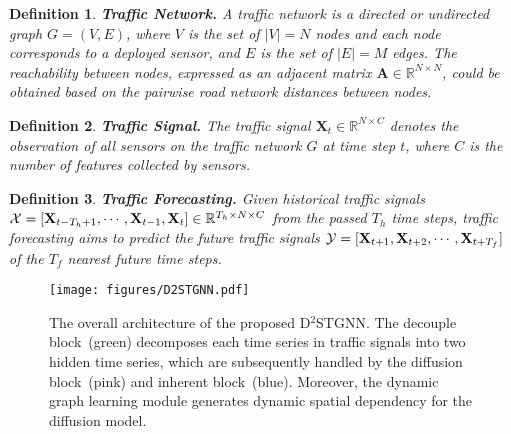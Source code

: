\documentclass[sigconf, nonacm]{acmart}
\def\bb#1{\mathbb{#1}}
\def\b#1{\mathbf{#1}}
\def\cal#1{\mathcal{#1}}
\newtheorem{definition}{Definition}
\begin{document}
\begin{definition}
\textbf{Traffic Network.} 
A traffic network is a directed or undirected graph $G=(V, E)$, where $V$ is the set of $|V|=N$ nodes and each node corresponds to a deployed sensor, {\color{black}and} $E$ is the set of $|E|=M$ edges. 
The reachability between nodes, expressed as an adjacent matrix $\b{A}\in\bb{R}^{N\times N}$, could be obtained based on the pairwise road network distances between nodes.
\end{definition}
\begin{definition}
\textbf{Traffic Signal.} 
The traffic signal $\b{X}_t\in\bb{R}^{N\times C}$ denotes the observation of all sensors on the traffic network $G$ at time step $t$, where {\color{black}$C$ is the number of features collected by sensors}.
\end{definition}
\begin{definition}
\textbf{Traffic Forecasting.}
Given historical traffic signals ${\color{black} \cal{X}}={\color{black}[}\mathbf{X}_{t-T_h+1},\cdots, \mathbf{X}_{t-1},\mathbf{X}_{t}{\color{black}]}\in\bb{R}^{T_h\times N\times C}$ from the passed $T_h$ time steps, traffic forecasting aims to predict the future traffic signals ${\color{black} \cal{Y}}={\color{black}[}\mathbf{X}_{t+1},\mathbf{X}_{t+2},\cdots,\mathbf{X}_{t+T_f}{\color{black}]}$ of the $T_f$ nearest future time steps.
\end{definition}

 \begin{figure*}[ht]
  \centering
\texttt{[image: figures/D2STGNN.pdf]}
  \caption{
The overall architecture of {\color{black}the proposed D$^2$STGNN.
The decouple block~(green) decomposes each time series in traffic signals into two hidden time series, which are subsequently handled by the diffusion block~(pink) and inherent block~(blue). 
Moreover, the dynamic graph learning module generates dynamic spatial dependency for the diffusion model.}
}

  \label{D2GNN}
\end{figure*}
\end{document}
